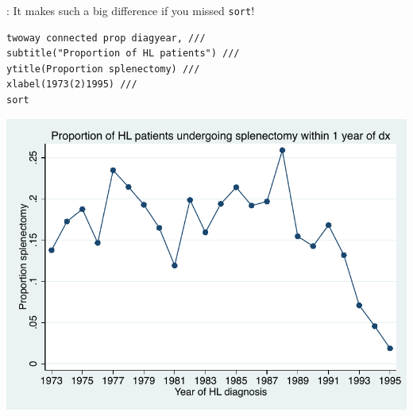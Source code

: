 \begin{frame}[fragile]{\secname: \subsecname}
It makes such a big difference if you missed \verb|sort|!

\small
\begin{verbatim}
twoway connected prop diagyear, ///
subtitle("Proportion of HL patients") ///
ytitle(Proportion splenectomy) ///
xlabel(1973(2)1995) ///
sort	
\end{verbatim}
\begin{center}
	\includegraphics[scale=0.4]{images/sort}
\end{center}

\end{frame}

